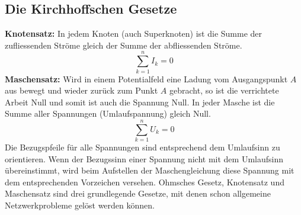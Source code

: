 \subsection{Die Kirchhoffschen Gesetze}
\textbf{Knotensatz:} In jedem Knoten (auch Superknoten) ist die Summe der zufliessenden Ströme gleich der Summe der abfliessenden Ströme.
\begin{equation}
\boxed{\displaystyle \sum_{k=1}^nI_k=0}
\end{equation}
\textbf{Maschensatz:} Wird in einem Potentialfeld eine Ladung vom Ausgangspunkt $A$ aus bewegt und wieder zurück zum Punkt $A$ gebracht, so ist die verrichtete Arbeit Null und somit ist auch die Spannung Null. In jeder Masche ist die Summe aller Spannungen (Umlaufspannung) gleich Null.
\begin{equation}
\boxed{\displaystyle \sum_{k=1}^nU_k=0}
\end{equation}
Die Bezugspfeile für alle Spannungen sind entsprechend dem Umlaufsinn zu orientieren. Wenn der Bezugssinn einer Spannung nicht mit dem Umlaufsinn übereinstimmt, wird beim Aufstellen der Maschengleichung diese Spannung mit dem entsprechenden Vorzeichen versehen.
\newline\newline
Ohmsches Gesetz, Knotensatz und Maschensatz sind drei grundlegende Gesetze, mit denen schon allgemeine Netzwerkprobleme gelöst werden können.
